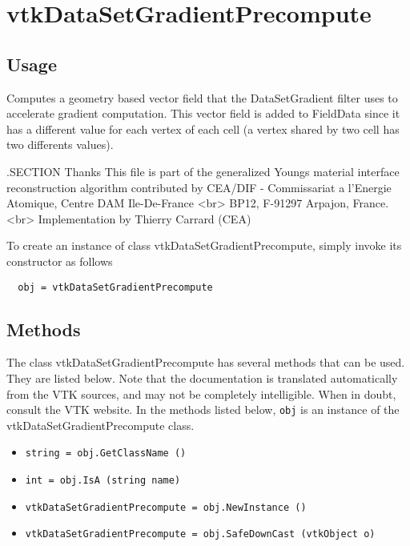 \section{vtkDataSetGradientPrecompute}

\subsection{Usage}

 Computes a geometry based vector field that the DataSetGradient filter uses to accelerate
 gradient computation. This vector field is added to FieldData since it has a different
 value for each vertex of each cell (a vertex shared by two cell has two differents values).

 .SECTION Thanks
 This file is part of the generalized Youngs material interface reconstruction algorithm contributed by
 CEA/DIF - Commissariat a l'Energie Atomique, Centre DAM Ile-De-France <br>
 BP12, F-91297 Arpajon, France. <br>
 Implementation by Thierry Carrard (CEA)

To create an instance of class vtkDataSetGradientPrecompute, simply
invoke its constructor as follows
\begin{verbatim}
  obj = vtkDataSetGradientPrecompute
\end{verbatim}
\subsection{Methods}

The class vtkDataSetGradientPrecompute has several methods that can be used.
  They are listed below.
Note that the documentation is translated automatically from the VTK sources,
and may not be completely intelligible.  When in doubt, consult the VTK website.
In the methods listed below, \verb|obj| is an instance of the vtkDataSetGradientPrecompute class.
\begin{itemize}
\item  \verb|string = obj.GetClassName ()|

\item  \verb|int = obj.IsA (string name)|

\item  \verb|vtkDataSetGradientPrecompute = obj.NewInstance ()|

\item  \verb|vtkDataSetGradientPrecompute = obj.SafeDownCast (vtkObject o)|

\end{itemize}
